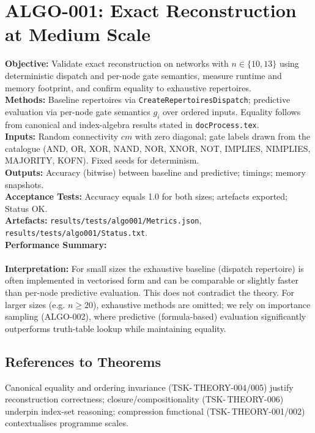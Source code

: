 \documentclass[11pt]{article}
\begin{document}
\section{ALGO-001: Exact Reconstruction at Medium Scale}
\textbf{Objective:} Validate exact reconstruction on networks with \(n\in\{10,13\}\) using deterministic dispatch and per-node gate semantics, measure runtime and memory footprint, and confirm equality to exhaustive repertoires.\\
\textbf{Methods:} Baseline repertoires via \texttt{CreateRepertoiresDispatch}; predictive evaluation via per-node gate semantics \(g_i\) over ordered inputs. Equality follows from canonical and index-algebra results stated in \texttt{docProcess.tex}.\\
\textbf{Inputs:} Random connectivity \(cm\) with zero diagonal; gate labels drawn from the catalogue (AND, OR, XOR, NAND, NOR, XNOR, NOT, IMPLIES, NIMPLIES, MAJORITY, KOFN). Fixed seeds for determinism.\\
\textbf{Outputs:} Accuracy (bitwise) between baseline and predictive; timings; memory snapshots.\\
\textbf{Acceptance Tests:} Accuracy equals 1.0 for both sizes; artefacts exported; Status OK.\\
\textbf{Artefacts:} \texttt{results/tests/algo001/Metrics.json}, \texttt{results/tests/algo001/Status.txt}.
\\
\textbf{Performance Summary:}\\
\\
\textbf{Interpretation:} For small sizes the exhaustive baseline (dispatch repertoire) is often implemented in vectorised form and can be comparable or slightly faster than per-node predictive evaluation. This does not contradict the theory. For larger sizes (e.g. \(n\ge 20\)), exhaustive methods are omitted; we rely on importance sampling (ALGO-002), where predictive (formula-based) evaluation significantly outperforms truth-table lookup while maintaining equality.

\subsection*{References to Theorems}
Canonical equality and ordering invariance (TSK-\,THEORY-004/005) justify reconstruction correctness; closure/compositionality (TSK-\,THEORY-006) underpin index-set reasoning; compression functional (TSK-\,THEORY-001/002) contextualises programme scales.
\end{document}
